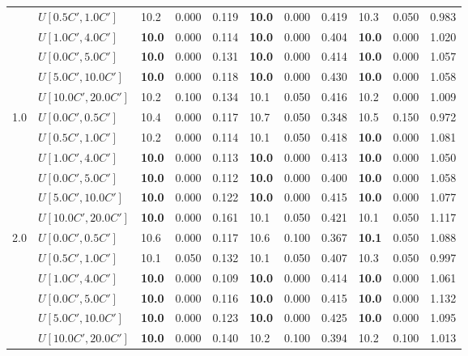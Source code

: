 \begin{table}[h]
{\begin{tabular}{|l|l||l|l|l||l|l|l||l|l|l|}
       & $U[0.5C',1.0C']$ & 10.2 & 0.000 & 0.119 & \textbf{10.0} & 0.000 & 0.419 & 10.3 & 0.050 & 0.983 \\
       & $U[1.0C',4.0C']$ & \textbf{10.0} & 0.000 & 0.114 & \textbf{10.0} & 0.000 & 0.404 & \textbf{10.0} & 0.000 & 1.020 \\
       & $U[0.0C',5.0C']$ & \textbf{10.0} & 0.000 & 0.131 & \textbf{10.0} & 0.000 & 0.414 & \textbf{10.0} & 0.000 & 1.057 \\
       & $U[5.0C',10.0C']$ & \textbf{10.0} & 0.000 & 0.118 & \textbf{10.0} & 0.000 & 0.430 & \textbf{10.0} & 0.000 & 1.058 \\
       & $U[10.0C',20.0C']$ & 10.2 & 0.100 & 0.134 & 10.1 & 0.050 & 0.416 & 10.2 & 0.000 & 1.009 \\
      \hline\hline
      \multirow{6}{*}{1.0} & $U[0.0C',0.5C']$ & 10.4 & 0.000 & 0.117 & 10.7 & 0.050 & 0.348 & 10.5 & 0.150 & 0.972 \\
       & $U[0.5C',1.0C']$ & 10.2 & 0.000 & 0.114 & 10.1 & 0.050 & 0.418 & \textbf{10.0} & 0.000 & 1.081 \\
       & $U[1.0C',4.0C']$ & \textbf{10.0} & 0.000 & 0.113 & \textbf{10.0} & 0.000 & 0.413 & \textbf{10.0} & 0.000 & 1.050 \\
       & $U[0.0C',5.0C']$ & \textbf{10.0} & 0.000 & 0.112 & \textbf{10.0} & 0.000 & 0.400 & \textbf{10.0} & 0.000 & 1.058 \\
       & $U[5.0C',10.0C']$ & \textbf{10.0} & 0.000 & 0.122 & \textbf{10.0} & 0.000 & 0.415 & \textbf{10.0} & 0.000 & 1.077 \\
       & $U[10.0C',20.0C']$ & \textbf{10.0} & 0.000 & 0.161 & 10.1 & 0.050 & 0.421 & 10.1 & 0.050 & 1.117 \\
      \hline\hline
      \multirow{6}{*}{2.0} & $U[0.0C',0.5C']$ & 10.6 & 0.000 & 0.117 & 10.6 & 0.100 & 0.367 & \textbf{10.1} & 0.050 & 1.088 \\
       & $U[0.5C',1.0C']$ & 10.1 & 0.050 & 0.132 & 10.1 & 0.050 & 0.407 & 10.3 & 0.050 & 0.997 \\
       & $U[1.0C',4.0C']$ & \textbf{10.0} & 0.000 & 0.109 & \textbf{10.0} & 0.000 & 0.414 & \textbf{10.0} & 0.000 & 1.061 \\
       & $U[0.0C',5.0C']$ & \textbf{10.0} & 0.000 & 0.116 & \textbf{10.0} & 0.000 & 0.415 & \textbf{10.0} & 0.000 & 1.132 \\
       & $U[5.0C',10.0C']$ & \textbf{10.0} & 0.000 & 0.123 & \textbf{10.0} & 0.000 & 0.425 & \textbf{10.0} & 0.000 & 1.095 \\
       & $U[10.0C',20.0C']$ & \textbf{10.0} & 0.000 & 0.140 & 10.2 & 0.100 & 0.394 & 10.2 & 0.100 & 1.013 \\

\end{tabular}}
\end{table}
